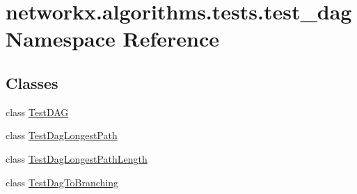 \hypertarget{namespacenetworkx_1_1algorithms_1_1tests_1_1test__dag}{}\section{networkx.\+algorithms.\+tests.\+test\+\_\+dag Namespace Reference}
\label{namespacenetworkx_1_1algorithms_1_1tests_1_1test__dag}
\subsection*{Classes}
\begin{DoxyCompactItemize}
\item 
class \hyperlink{classnetworkx_1_1algorithms_1_1tests_1_1test__dag_1_1TestDAG}{Test\+D\+AG}
\item 
class \hyperlink{classnetworkx_1_1algorithms_1_1tests_1_1test__dag_1_1TestDagLongestPath}{Test\+Dag\+Longest\+Path}
\item 
class \hyperlink{classnetworkx_1_1algorithms_1_1tests_1_1test__dag_1_1TestDagLongestPathLength}{Test\+Dag\+Longest\+Path\+Length}
\item 
class \hyperlink{classnetworkx_1_1algorithms_1_1tests_1_1test__dag_1_1TestDagToBranching}{Test\+Dag\+To\+Branching}
\end{DoxyCompactItemize}
